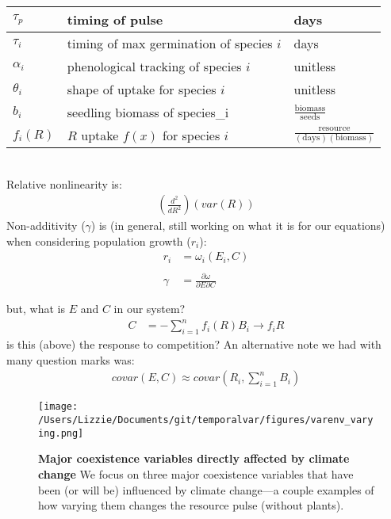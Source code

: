 \documentclass[11pt,a4paper,oneside]{article}
\begin{document}
\begin{center}
\begin{table}[h!]
\begin{tabular}{ | p{3.0cm} | p{6.0cm} | p{4.0cm} |}
\(\tau_{p}\) & timing of pulse & days \\ \hline
\(\tau_{i}\) & timing of max germination of species \(i\) & days \\ \hline
\(\alpha_{i}\) & phenological tracking of species \(i\) & unitless \\ \hline
\(\theta_{i}\) & shape of uptake for species \(i\) & unitless\\ \hline
\hline
\(b_{i}\) & seedling biomass of species_{i} & \(\frac{\text{biomass}}{\text{seeds}}\) \\ \hline
\(f_{i}(R)\) & \(R\) uptake \(f(x)\) for species \(i\) & \(\frac{\text{resource}}{(\text{days})(\text{biomass})}\)\\
\hline
\end{tabular}
\end{table}
\end{center}


\newpage
{}\\
\noindent Relative nonlinearity is:
\begin{align*}
\left(\frac{d^{2}}{dR^{2}}\right)(var(R))
\end{align*}
\noindent Non-additivity (\(\gamma\)) is (in general, still working on
what it is for our equations) when considering population growth
(\(r_{i}\)):
\begin{align*}
r_{i} & = \omega_{i}(E_{i}, C)
\\
\\
\gamma & = \frac{\partial \omega}{\partial E \partial C} 
\end{align*}

\noindent but, what is \(E\) and \(C\) in our system?
\begin{align*}
C & = - \sum_{i=1}^{n}f_{i}(R)B_{i} \rightarrow f_{i}R
\end{align*}
\noindent is this (above) the response to
  competition? An alternative note we had with many question marks
  was:
\begin{align*}
covar(E,C) \approx covar\left(R_{i}, \sum_{i=1}^{n}B_{i}\right)
\end{align*}

\newpage



\newpage
\begin{figure}[h!]
\centering
\noindent \texttt{[image: /Users/Lizzie/Documents/git/temporalvar/figures/varenv\_varying.png]}
\caption{{\bf Major coexistence variables directly affected by
    climate change}  We focus on three major coexistence variables
  that have been (or will be) influenced by climate change---a couple
  examples of how varying them changes the resource pulse (without plants).}
\end{figure}
\end{document}
